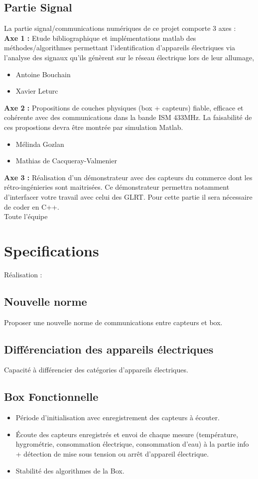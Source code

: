 \documentclass[10pt,a4paper]{article}
\begin{document}
\subsection{Partie Signal}
La partie signal/communications numériques de ce projet comporte 3 axes :\\
\textbf{Axe 1 :} Etude bibliographique et implémentations matlab des méthodes/algorithmes permettant l’identification
d’appareils électriques via l’analyse des signaux qu’ils génèrent sur le réseau électrique lors de leur allumage,
\begin{itemize}
\item Antoine Bouchain
\item Xavier Leturc
\end{itemize}
\textbf{Axe 2 :} Propositions de couches physiques (box + capteurs) fiable, efficace et cohérente avec des communications
dans la bande ISM 433MHz. La faisabilité de ces propostions devra être montrée par simulation Matlab.
\begin{itemize}
\item Mélinda Gozlan
\item Mathias de Cacqueray-Valmenier
\end{itemize}
\textbf{Axe 3 :} Réalisation d’un démonstrateur avec des capteurs du commerce dont les rétro-ingénieries sont maitrisées.
Ce démonstrateur permettra notamment d’interfacer votre travail avec celui des GLRT. Pour cette partie il sera
nécessaire de coder en C++. \\
Toute l'équipe
\newpage
\section{Specifications}
Réalisation :
\subsection{Nouvelle norme}
Proposer une nouvelle norme de communications entre capteurs et box.
\subsection{Différenciation des appareils électriques}
Capacité à différencier des catégories d'appareils électriques.

\subsection{Box Fonctionnelle}
\begin{itemize}
  \item Période d'initialisation avec enregistrement des capteurs à écouter.
  \item Écoute des capteurs enregistrés et envoi de chaque mesure (température, hygrométrie, consommation électrique, consommation d'eau) à la partie info + détection de mise sous tension ou arrêt d'appareil électrique.
  \item Stabilité des algorithmes de la Box.
\end{itemize}
\end{document}
